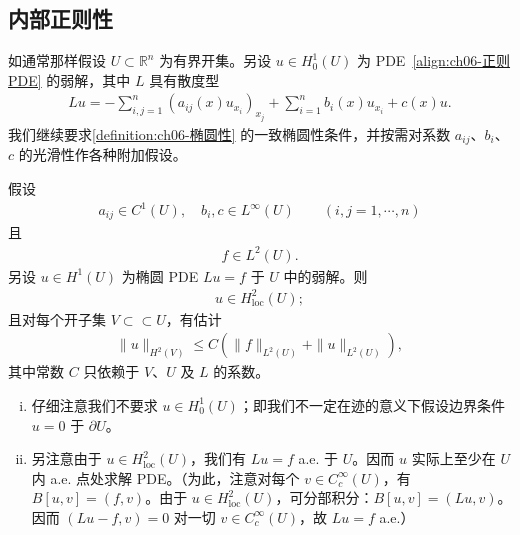 \documentclass[../../main.tex]{subfiles}
\begin{document}
\subsection{内部正则性}\label{subsection:ch06-内部正则性}

如通常那样假设 $U\subset\mathbb{R}^{n}$ 为有界开集。另设 $u\in H^{1}_{0}(U)$ 为 PDE~\eqref{align:ch06-正则PDE} 的弱解，其中 $L$ 具有散度型
\begin{align}
Lu=-\sum_{i,j=1}^{n}(a_{ij}(x)u_{x_{i}})_{x_{j}}+\sum_{i=1}^{n}b_{i}(x)u_{x_{i}}+c(x)u.
\end{align}
我们继续要求\cref{definition:ch06-椭圆性} 的一致椭圆性条件，并按需对系数 $a_{ij}$、$b_{i}$、$c$ 的光滑性作各种附加假设。

\begin{theorem}[内部 $H^{2}$ 正则性]\label{theorem:ch06-内部H2正则}假设
\begin{align}
a_{ij}\in C^{1}(U),\quad b_{i},c\in L^{\infty}(U)\qquad (i,j=1,\cdots,n)
\end{align}
且
\begin{align}
f\in L^{2}(U).
\end{align}
另设 $u\in H^{1}(U)$ 为椭圆 PDE $Lu=f$ 于 $U$ 中的弱解。则
\begin{align}
u\in H^{2}_{\mathrm{loc}}(U);
\end{align}
且对每个开子集 $V\subset \subset U$，有估计
\begin{align}
\|u\|_{H^{2}(V)}\leqslant C(\|f\|_{L^{2}(U)}+\|u\|_{L^{2}(U)}),
\end{align}
其中常数 $C$ 只依赖于 $V$、$U$ 及 $L$ 的系数。
\end{theorem}

\begin{remark}\label{remark:ch06-内部正则注}
\leavevmode
\begin{enumerate}[(i)]
\item 仔细注意我们不要求 $u\in H^{1}_{0}(U)$；即我们不一定在迹的意义下假设边界条件 $u=0$ 于 $\partial U$。
\item 另注意由于 $u\in H^{2}_{\mathrm{loc}}(U)$，我们有 $Lu=f$ a.e. 于 $U$。因而 $u$ 实际上至少在 $U$ 内 a.e. 点处求解 PDE。（为此，注意对每个 $v\in C^{\infty}_{c}(U)$，有 $B[u,v]=(f,v)$。由于 $u\in H^{2}_{\mathrm{loc}}(U)$，可分部积分：$B[u,v]=(Lu,v)$。因而 $(Lu-f,v)=0$ 对一切 $v\in C^{\infty}_{c}(U)$，故 $Lu=f$ a.e.）
\end{enumerate}
\end{remark}
\end{document}
